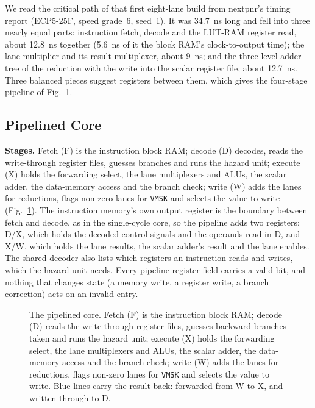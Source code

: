 We read the critical path of that first eight-lane build from nextpnr's timing report
(ECP5-25F, speed grade~6, seed~1). It was 34.7~ns long and fell into three nearly equal
parts: instruction fetch, decode and the LUT-RAM register read, about 12.8~ns together
(5.6~ns of it the block RAM's clock-to-output time); the lane multiplier and its result
multiplexer, about 9~ns; and the three-level adder tree of the reduction with the write
into the scalar register file, about 12.7~ns. Three balanced pieces suggest registers
between them, which gives the four-stage pipeline of Fig.~\ref{fig:pipe}.

\subsection{Pipelined Core}\label{sec:pipe}
\textbf{Stages.} Fetch (F) is the instruction block RAM; decode (D) decodes, reads the
write-through register files, guesses branches and runs the hazard unit; execute (X)
holds the forwarding select, the lane multiplexers and ALUs, the scalar adder, the
data-memory access and the branch check; write (W) adds the lanes for reductions, flags
non-zero lanes for \texttt{VMSK} and selects the value to write
(Fig.~\ref{fig:pipe}). The instruction memory's own output register is the boundary
between fetch and decode, as in the single-cycle core, so the pipeline adds two
registers: D/X, which holds the decoded control signals and the operands read in D, and
X/W, which holds the lane results, the scalar adder's result and the lane enables. The
shared decoder also lists which registers an instruction reads and writes, which the
hazard unit needs. Every pipeline-register field carries a valid bit, and nothing that
changes state (a memory write, a register write, a branch correction) acts on an invalid
entry.

\begin{figure}[t]
\centering

\caption{The pipelined core. Fetch (F) is the instruction block RAM; decode (D) reads
the write-through register files, guesses backward branches taken and runs the hazard
unit; execute (X) holds the forwarding select, the lane multiplexers and ALUs, the
scalar adder, the data-memory access and the branch check; write (W) adds the lanes for
reductions, flags non-zero lanes for \texttt{VMSK} and selects the value to write. Blue
lines carry the result back: forwarded from W to X, and written through to D.}
\label{fig:pipe}
\end{figure}

